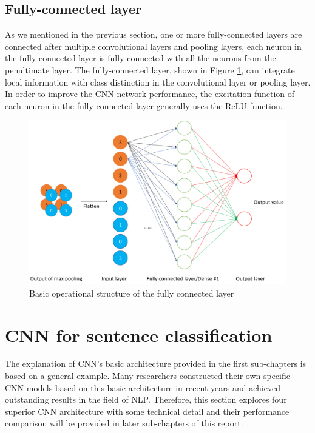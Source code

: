 \documentclass[]{krantz}
\begin{document}
\hypertarget{fully-connected-layer}{%
\subsection{Fully-connected layer}\label{fully-connected-layer}}

As we mentioned in the previous section, one or more fully-connected layers are connected after multiple convolutional layers and pooling layers, each neuron in the fully connected layer is fully connected with all the neurons from the penultimate layer. The fully-connected layer, shown in Figure \ref{fig:figs-6}, can integrate local information with class distinction in the convolutional layer or pooling layer. In order to improve the CNN network performance, the excitation function of each neuron in the fully connected layer generally uses the ReLU function.

\begin{figure}[ht]

{\centering \includegraphics[width=0.6\linewidth]{figures/01-03-cnns-and-their-applications-in-nlp/Fully_Connected} 

}

\caption{Basic operational structure of the fully connected layer}\label{fig:figs-6}
\end{figure}

\hypertarget{cnn-for-sentence-classification}{%
\section{CNN for sentence classification}\label{cnn-for-sentence-classification}}

The explanation of CNN's basic architecture provided in the first sub-chapters is based on a general example. Many researchers constructed their own specific CNN models based on this basic architecture in recent years and achieved outstanding results in the field of NLP. Therefore, this section explores four superior CNN architecture with some technical detail and their performance comparison will be provided in later sub-chapters of this report.
\end{document}
